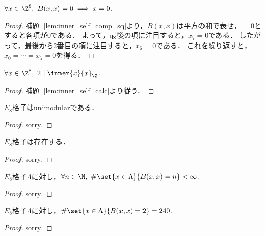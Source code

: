 \begin{theorem}
  \label{thm:inner_self_eq_zero}
  \leanok
  $\forall x \in \Z^8,\ B(x, x) = 0 \implies x = 0$.
\end{theorem}

\begin{proof}
  \leanok
  補題~\ref{lem:inner_self_comp_sq}より，$B(x, x)$は平方の和で表せ，$= 0$とすると各項が$0$である．
  よって，最後の項に注目すると，$x_7 = 0$である．
  したがって，最後から2番目の項に注目すると，$x_6 = 0$である．
  これを繰り返すと，$x_0 = \cdots = x_7 = 0$を得る．
\end{proof}

\begin{theorem}
  \label{thm:even}
  \leanok
  $\forall x \in \Z^8,\ 2 \mid \inner{x}{x}_{\Z}$.
\end{theorem}

\begin{proof}
  \leanok
  補題~\ref{lem:inner_self_calc}より従う．
\end{proof}

\begin{theorem}
  \label{thm:unimodular}
  \leanok
  $E_8$格子はunimodularである．
\end{theorem}

\begin{proof}
  sorry.
\end{proof}

\begin{theorem}
  \label{thm:exists_E8}
  \leanok
  $E_8$格子は存在する．
\end{theorem}

\begin{proof}
  sorry.
\end{proof}

\begin{theorem}
  $E_8$格子$\Lambda$に対し，$\forall n \in \N,\ \#\set{x \in \Lambda}{B(x, x) = n} < \infty$.
\end{theorem}

\begin{proof}
  sorry.
\end{proof}

\begin{lemma}
  \label{lem:card_norm_2}
  \leanok
  $E_8$格子$\Lambda$に対し，$\#\set{x \in \Lambda}{B(x, x) = 2} = 240$.
\end{lemma}

\begin{proof}
  sorry.
\end{proof}
